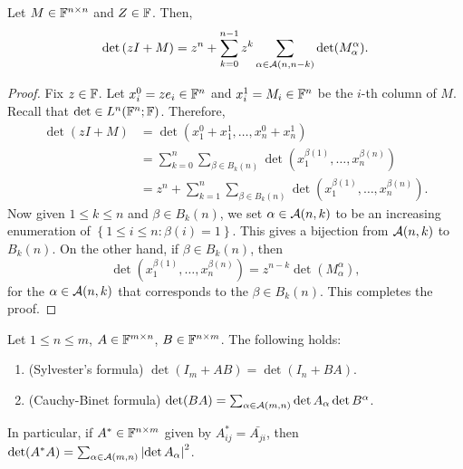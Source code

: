 \documentclass[a4paper]{article}
\begin{document}
\begin{thm}
Let $M \in \mathbb{F}^{n \times n}$ and $Z \in \mathbb{F}$. Then, 
\[
\det \left( zI + M \right) = z^n + \sum_{k=0}^{n-1}
z^k \sum_{\alpha \in \mathcal{A}(n, n - k)} \det(M_\alpha^\alpha).
\]
\end{thm}

\begin{proof}
Fix $z \in \mathbb{F}$. Let $x_i^0 = z e_i \in \mathbb{F}^n$ and 
$x_i^1 = M_i \in \mathbb{F}^n$ be the $i$-th column of $M$. 
Recall that $\det \in L^n (\mathbb{F}^n ; \mathbb{F})$. Therefore, 
\[
\begin{aligned}
\det (z I + M) 
&= \det (x_1^0 + x_1^1, \dots, x_n^0 + x_n^1) \\ 
&= \sum_{k=0}^n \sum_{\beta \in B_k(n)} 
\det (x_1^{\beta(1)}, \dots, x_n^{\beta(n)}) \\ 
&= z^n + \sum_{k=1}^n \sum_{\beta \in B_k(n)} 
\det (x_1^{\beta(1)}, \dots, x_n^{\beta(n)}).
\end{aligned}
\]
Now given $1 \leq k \leq n$ and $\beta \in B_k(n)$, 
we set $\alpha \in \mathcal{A}(n, k)$ to be an increasing 
enumeration of $\left\{ 1 \leq i \leq n : \beta(i) = 1 
\right\}$. This gives a bijection from $\mathcal{A}(n, k)$
to $B_k(n)$. On the other hand, if $\beta \in B_k(n)$, 
then 
\[
\det (x_1^{\beta(1)}, \dots, x_n^{\beta(n)}) 
= z^{n - k} \det(M_\alpha^\alpha),
\]
for the $\alpha \in \mathcal{A}(n, k)$ that corresponds to 
the $\beta \in B_k(n)$. This completes the proof.
\end{proof}

\begin{thm}
Let $1 \leq n \leq m$, $A \in \mathbb{F}^{m \times n}$, 
$B \in \mathbb{F}^{n \times m}$. The following holds: 
\begin{enumerate}
\item (Sylvester's formula) $\det(I_m + A B)
= \det(I_n + BA)$.

\item (Cauchy-Binet formula) $\det(BA) = \sum_{\alpha 
\in \mathcal{A}(m, n)} \det A_\alpha \det B^\alpha$.
\end{enumerate}
In particular, if $A^* \in \mathbb{F}^{n \times m}$ given 
by $A^*_{ij} = \bar{A_{ji}}$, then 
$\det(A^* A) = \sum_{\alpha \in \mathcal{A}(m, n)} 
\left\lvert \det A_\alpha\right\rvert^2$.
\end{thm}
\end{document}
